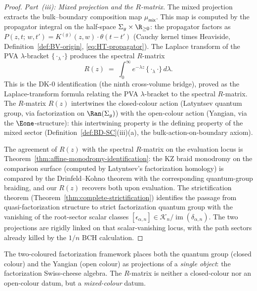 \begin{proof}
\smallskip\noindent
\emph{Part~(iii): Mixed projection and the $R$-matrix.}
The mixed projection extracts the bulk--boundary composition map
$\mu_{\mathsf{mix}}$. This map is computed by the propagator
integral on the half-space $\Sigma_g \times \R_{\geq 0}$:
the propagator factors as
$P(z,t;\,w,t') = K^{(g)}(z,w) \cdot \theta(t-t')$
(Cauchy kernel times Heaviside,
Definition~\ref{def:BV-origin}, \eqref{eq:HT-propagator}).
The Laplace transform of the PVA $\lambda$-bracket
$\{{\cdot}_\lambda{\cdot}\}$ produces the spectral $R$-matrix
\[
 R(z)
 \;=\;
 \int_0^\infty e^{-\lambda z}\,
 \{{\cdot}_\lambda{\cdot}\}\, d\lambda.
\]
This is the DK-0 identification (the ninth cross-volume bridge),
proved as the Laplace-transform formula relating the PVA
$\lambda$-bracket to the spectral $R$-matrix. The $R$-matrix
$R(z)$ intertwines the closed-colour action
(Latyntsev quantum group, via factorization on $\Ran(\Sigma_g)$)
with the open-colour action (Yangian, via the
$\Eone$-structure): this intertwining property is the
defining property of the mixed sector
(Definition~\ref{def:BD-SC}(iii)(a), the bulk-action-on-boundary
axiom).

The agreement of $R(z)$ with the spectral $R$-matrix on the
evaluation locus is
Theorem~\ref{thm:affine-monodromy-identification}:
the KZ braid monodromy on the comparison surface
(computed by Latyntsev's factorization homology) is compared by
the Drinfeld--Kohno theorem with the corresponding quantum-group
braiding, and our $R(z)$ recovers both
upon evaluation. The strictification theorem
(Theorem~\ref{thm:complete-strictification}) identifies the passage
from quasi-factorization structure to strict factorization quantum
group with the vanishing of the root-sector scalar classes
$[\epsilon_{\alpha,n}]\in
\mathscr K_n/\operatorname{im}(\delta_{\alpha,n})$. The two
projections are rigidly linked on that scalar-vanishing locus, with
the path sectors already killed by the $1/n$ BCH calculation.
\end{proof}

\begin{remark}
\label{rem:latyntsev-what-is-new}
The two-coloured factorization framework places both the quantum
group (closed colour) and the Yangian (open colour) as projections
of a \emph{single object}: the factorization Swiss-cheese algebra.
The $R$-matrix is neither a closed-colour nor an open-colour datum,
but a \emph{mixed-colour} datum.
\end{remark}


